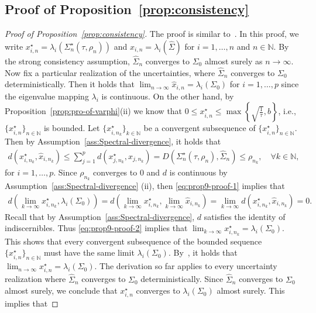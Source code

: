 \documentclass[11pt]{article}
\newcommand{\bgeqn}{\begin{eqnarray}}
\newcommand{\edeqn}{\end{eqnarray}}
\newcommand{\opt}{^\star}
\newcommand{\wh}{\widehat}
\begin{document}
\subsection{Proof of Proposition~\ref{prop:consistency}}
\begin{proof}[Proof of Proposition~\ref{prop:consistency}]
    The proof  is similar to~\citet[Proposition 7]{ref:yue2024geometric}. In this proof, we write $x\opt_{i,n}=\lambda_i(\Sigma\opt_{n}(\tau, \rho_n))$ and $\wh{x}_{i,n}=\lambda_i(\wh\Sigma)$ for $i=1,\ldots,n$ and $n\in \mathbb{N}$. By the strong consistency assumption, $\wh\Sigma_n$ converges to $\Sigma_0$ almost surely as $n\to\infty$. Now fix a particular realization of the uncertainties, where $\wh\Sigma_n$ converges to $\Sigma_0$ deterministically. Then it holds that $\lim_{n\to\infty} \wh{x}_{i,n}=\lambda_i(\Sigma_0)$ for $i=1,\ldots,p$ since the eigenvalue mapping $\lambda_i$ is continuous. On the other hand, by Proposition~\ref{prop:pro-of-varphi}(ii) we know that $0\leq x\opt_{i,n} \leq \max\left\{\sqrt{\frac{1}{\tau}},b\right\}$, i.e., $\{x\opt_{i,n}\}_{n\in\mathbb{N}}$ is bounded. Let $\{x\opt_{i,n_k}\}_{k\in\mathbb{N}}$ be a convergent subsequence of $\{x\opt_{i,n}\}_{n\in\mathbb{N}}$. Then by Assumption~\ref{ass:Spectral-divergence}, it holds that 
    \bgeqn 
    \label{eq:prop9-proof-1}
    d\left(x\opt_{i,n_k},\wh{x}_{i,n_k}\right) \leq \sum_{j=1}^p d(x\opt_{j,n_k},\wh{x}_{j,n_k}) = D\left(\Sigma\opt_n(\tau, \rho_n), \wh\Sigma_n\right) \leq  \rho_{n_k},\quad \forall k \in\mathbb{N},
    \edeqn 
    for $i=1,\ldots,p$. Since $ \rho_{n_k}$ converges to $0$ and $d$ is continuous by Assumption~\ref{ass:Spectral-divergence} (ii), then \eqref{eq:prop9-proof-1} implies that 
    \bgeqn
    \label{eq:prop9-proof-2}
        d\left(\lim_{k\to\infty} x\opt_{i,n_k},\lambda_i(\Sigma_0)\right) = d\left(\lim_{k\to\infty} x\opt_{i,n_k},\lim_{k\to\infty} \wh{x}_{i,n_k}\right) = \lim_{k\to\infty}d\left(x\opt_{i,n_k},\wh{x}_{i,n_k}\right) = 0.
    \edeqn 
    Recall that by Assumption~\ref{ass:Spectral-divergence}, $d$ satisfies the identity of indiscernibles. Thus \eqref{eq:prop9-proof-2} implies that $\lim_{k\to\infty} x\opt_{i,n_k}=\lambda_i(\Sigma_0)$. This shows that every convergent subsequence of the bounded sequence $\{x\opt_{i,n}\}_{n\in\mathbb{N}}$ must have the same limit $\lambda_i(\Sigma_0)$. By~\cite[Exercise 2.5.5]{ref:abbott2015understanding}, it holds that $\lim_{n\to\infty} x\opt_{i,n} = \lambda_i(\Sigma_0)$. The derivation so far applies to every uncertainty realization where $\wh\Sigma_n$ converges to $\Sigma_0$ deterministically. Since $\wh\Sigma_n$ converges to $\Sigma_0$ almost surely, we conclude that $x\opt_{i,n}$ converges to $\lambda_i(\Sigma_0)$ almost surely. This implies that 

\end{proof}
\end{document}
